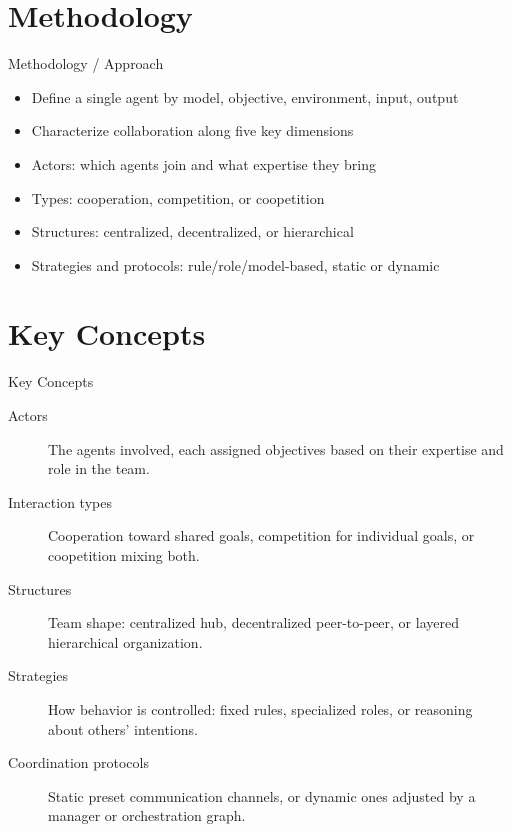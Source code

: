 \documentclass[10pt]{beamer}
\begin{document}
\section{Methodology}
\begin{frame}[allowframebreaks]{Methodology / Approach}
\begin{itemize}
  \item Define a single agent by model, objective, environment, input, output
  \item Characterize collaboration along five key dimensions
  \item Actors: which agents join and what expertise they bring
  \item Types: cooperation, competition, or coopetition
  \item Structures: centralized, decentralized, or hierarchical
  \item Strategies and protocols: rule/role/model-based, static or dynamic
\end{itemize}
\end{frame}

\section{Key Concepts}
\begin{frame}[allowframebreaks]{Key Concepts}
  \begin{description}
    \item[Actors] The agents involved, each assigned objectives based on their expertise and role in the team.
    \item[Interaction types] Cooperation toward shared goals, competition for individual goals, or coopetition mixing both.
    \item[Structures] Team shape: centralized hub, decentralized peer-to-peer, or layered hierarchical organization.
    \item[Strategies] How behavior is controlled: fixed rules, specialized roles, or reasoning about others' intentions.
    \item[Coordination protocols] Static preset communication channels, or dynamic ones adjusted by a manager or orchestration graph.
  \end{description}
\end{frame}
\end{document}
